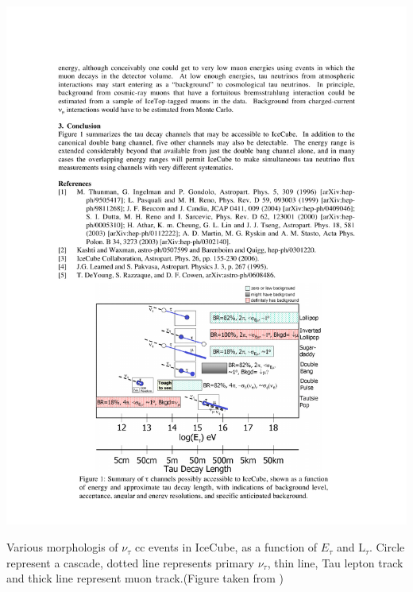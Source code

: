 \begin{marginfigure}
	\centering \includegraphics{./figures/nu_in_icecube/tau_interactions.pdf}
	\caption{Various morphologis of $\nu_{\tau}$ cc events in IceCube, as a function of $E_{\tau}$ and $\mathrm{L}_\tau$. Circle represent a cascade, dotted line represents primary $\nu_{\tau}$, thin line, Tau lepton track and thick line represent muon track.(Figure taken from \cite{Tau_int_inice})}
\end{marginfigure}

